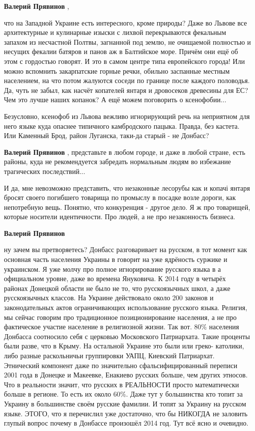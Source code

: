 \begin{itemize}
\begin{itemize}
\textbf{Валерий Прявинов} , 

что на Западной Украине есть интересного, кроме природы? Даже во Львове все
архитектурные и кулинарные изыски с лихвой перекрываются фекальным запахом из
несчастной Полтвы, загнанной под землю, не очищаемой полностью и несущих
фекалии батяров и панов аж в Балтийское море. Причём они ещё об этом с
гордостью говорят. И это в самом центре типа европейского города! Или можно
вспомнить закарпатские горные речки, обильно заспанные местным населением, на
что потом жалуются соседи по границе после каждого половодья. Да, чуть не
забыл, как насчёт копателей янтаря и дровосеков древесины для ЕС? Чем это лучше
наших копанок? А ещё можем поговорить о ксенофобии...


Безусловно, ксенофоб из Львова вежливо игнорирующий речь на неприятном для него
языке куда опаснее типичного камбродского пацыка. Правда, без кастета. Или
Каменный Брод, район Луганска, таки-да старый - не Донбасс?

\textbf{Валерий Прявинов} , представьте в любом городе, и даже в любой стране, есть районы, куда не рекомендуется забредать нормальным людям во избежание трагических последствий...


И да, мне невозможно представить, что незаконные лесорубы как и копачі янтаря
бросят своего погибшего товарища по промыслу в посадке возле дороги, как
непотребную вещь. Понятно, что конкуренция - другое дело. Я ж про товарищей,
которые носители идентичности. Про людей, а не про незаконность бизнеса.

\textbf{Валерий Прявинов} 

ну зачем вы претворяетесь? Донбасс разговаривает на русском, в тот момент как
основная часть населения Украины в говорит на уже ядрёность суржике и
украинском. Я уже молчу про полное игнорирование русского языка в а официальном
уровне, даже во времена Януковича. К 2014 году в четырёх районах Донецкой
области не было не то, что русскоязычных школ, а даже русскоязычных классов. На
Украине действовало около 200 законов и законодательных актов ограничивающих
использование русского языка. Религия, мы сейчас говорим про традиционное
позиционирование населения, а не про фактическое участие население в
религиозной жизни. Так вот. 80\% населения Донбасса соотносило себя с церковью
Московского Патриархата. Такие проценты были разве, что в Крыму. На остальной
Украине это были или греко- католики, либо разные раскольничьи группировки
УАПЦ, Киевский Патриархат. Этнический компонент даже по значительно
сфальсифицированный переписи 2001 года в Донецке и Макеевке, Енакиево русских
больше, чем других этносов. Что в реальности значит, что русских в РЕАЛЬНОСТИ
просто математически больше в регионе. То есть их около 60\%. Даже тут у
большинства кто топит за Украину в большинстве своём русские фамилии. И топят
за Украину на русском языке. ЭТОГО, что я перечислил уже достаточно, что бы
НИКОГДА не заловить глупый вопрос почему в Донбассе произошёл 2014 год. Тут всё
ясно и очевидно.


\end{itemize}
\end{itemize}
